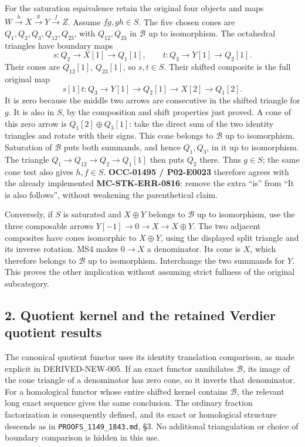 For the saturation equivalence retain the original four objects and maps \(W\xrightarrow hX\xrightarrow gY\xrightarrow fZ\). Assume \(fg,gh\in S\). The five chosen cones are \(Q_1,Q_2,Q_3,Q_{12},Q_{23}\),\allowbreak{} with \(Q_{12},Q_{23}\) in \(\mathcal B\) up to isomorphism. The octahedral triangles have boundary maps \[
s:Q_2\longrightarrow X[1]\longrightarrow Q_1[1],\qquad
t:Q_3\longrightarrow Y[1]\longrightarrow Q_2[1].
\] Their cones are \(Q_{12}[1]\),\allowbreak{} \(Q_{23}[1]\),\allowbreak{} so \(s,t\in S\). Their shifted composite is the full original map \[
s[1]t:Q_3\longrightarrow Y[1]\longrightarrow Q_2[1]
\longrightarrow X[2]\longrightarrow Q_1[2].
\] It is zero because the middle two arrows are consecutive in the shifted triangle for \(g\). It is also in \(S\),\allowbreak{} by the composition and shift properties just proved. A cone of this zero arrow is \(Q_1[2]\oplus Q_3[1]\):\allowbreak{} take the direct sum of the two identity triangles and rotate with their signs. This cone belongs to \(\mathcal B\) up to isomorphism. Saturation of \(\mathcal B\) puts both summands,\allowbreak{} and hence \(Q_1,Q_3\),\allowbreak{} in it up to isomorphism. The triangle \(Q_1\to Q_{12}\to Q_2\to Q_1[1]\) then puts \(Q_2\) there. Thus \(g\in S\); the same cone test also gives \(h,f\in S\). \textbf{OCC-01495 /\allowbreak{} P02-E0023} therefore agrees with the already implemented \textbf{MC-STK-ERR-0816}:\allowbreak{} remove the extra ``is'' from ``It is also follows”,\allowbreak{} without weakening the parenthetical claim.

Conversely,\allowbreak{} if \(S\) is saturated and \(X\oplus Y\) belongs to \(\mathcal B\) up to isomorphism,\allowbreak{} use the three composable arrows \(Y[-1]\to0\to X\to X\oplus Y\). The two adjacent composites have cones isomorphic to \(X\oplus Y\),\allowbreak{} using the displayed split triangle and its inverse rotation. MS4 makes \(0\to X\) a denominator. Its cone is \(X\),\allowbreak{} which therefore belongs to \(\mathcal B\) up to isomorphism. Interchange the two summands for \(Y\). This proves the other implication without assuming strict fullness of the original subcategory.

\subsection{2. Quotient kernel and the retained Verdier quotient results}\label{proofs-1844-2401-quotient-kernel-and-the-retained-verdier-quotient-results}

The canonical quotient functor uses its identity translation comparison,\allowbreak{} as made explicit in DERIVED-NEW-005. If an exact functor annihilates \(\mathcal B\),\allowbreak{} its image of the cone triangle of a denominator has zero cone,\allowbreak{} so it inverts that denominator. For a homological functor whose entire shifted kernel contains \(\mathcal B\),\allowbreak{} the relevant long exact sequence gives the same conclusion. The ordinary fraction factorization is consequently defined,\allowbreak{} and its exact or homological structure descends as in \texttt{PROOFS\_\allowbreak{}1149\_\allowbreak{}1843.\allowbreak{}md},\allowbreak{} §3. No additional triangulation or choice of boundary comparison is hidden in this use.

